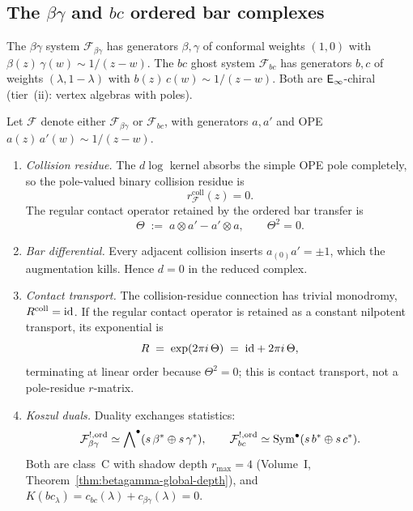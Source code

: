 \subsection{The \texorpdfstring{$\beta\gamma$}{beta-gamma} and
 \texorpdfstring{$bc$}{bc} ordered bar complexes}
\label{subsec:betagamma-ordered-bar}

The $\beta\gamma$ system $\mathcal{F}_{\beta\gamma}$ has generators
$\beta, \gamma$ of conformal weights $(1,0)$ with
$\beta(z)\,\gamma(w) \sim 1/(z{-}w)$. The $bc$ ghost system
$\mathcal{F}_{bc}$ has generators $b,c$ of weights
$(\lambda,1{-}\lambda)$ with
$b(z)\,c(w) \sim 1/(z{-}w)$. Both are $\mathsf{E}_{\infty}$-chiral
(tier~(ii): vertex algebras with poles).

\begin{theorem}
\label{thm:bg-ordered-bar}
\label{thm:bg-rmatrix}
\label{thm:bg-koszul-dual}
\label{thm:bc-ordered-bar}
Let $\mathcal{F}$ denote either $\mathcal{F}_{\beta\gamma}$ or
$\mathcal{F}_{bc}$, with generators $a,a'$ and OPE
$a(z)\,a'(w) \sim 1/(z{-}w)$.
\begin{enumerate}[label=\textup{(\alph*)}]
\item \emph{Collision residue.} The $d\log$ kernel absorbs the
simple OPE pole completely, so the pole-valued binary collision
residue is
\[
r^{\mathrm{coll}}_{\mathcal F}(z)=0.
\]
The regular contact operator retained by the ordered bar transfer is
\begin{equation}\label{eq:bg-theta}
\Theta \;:=\; a \otimes a' - a' \otimes a, \qquad
\Theta^2 = 0.
\end{equation}

\item \emph{Bar differential.} Every adjacent collision
inserts $a_{(0)}a' = \pm 1$, which the augmentation kills.
Hence $d = 0$ in the reduced complex.

\item \emph{Contact transport.} The collision-residue connection has
trivial monodromy, $R^{\mathrm{coll}}=\mathrm{id}$. If the regular contact
operator is retained as a constant nilpotent transport, its exponential is
\begin{equation}\label{eq:bg-rmatrix}
R \;=\; \exp(2\pi i\,\Theta) \;=\; \mathrm{id} + 2\pi i\,\Theta,
\end{equation}
terminating at linear order because $\Theta^2 = 0$; this is contact
transport, not a pole-residue $r$-matrix.

\item \emph{Koszul duals.} Duality exchanges statistics:
\begin{equation}\label{eq:bg-koszul-dual}
\mathcal{F}_{\beta\gamma}^{!,\mathrm{ord}}
\simeq \bigwedge\nolimits^{\bullet}(s\,\beta^*
 \oplus s\,\gamma^*),
\qquad
\mathcal{F}_{bc}^{!,\mathrm{ord}}
\simeq \mathrm{Sym}^{\bullet}(s\,b^*
 \oplus s\,c^*).
\end{equation}
Both are class~C with shadow depth $r_{\max} = 4$
\textup{(}Volume~I,
Theorem~\textup{\ref*{thm:betagamma-global-depth}}\textup{)},
and $K(bc_\lambda) = c_{bc}(\lambda)+c_{\beta\gamma}(\lambda) = 0$.
\end{enumerate}
\end{theorem}

